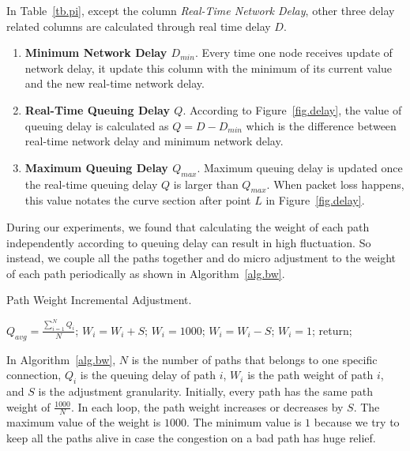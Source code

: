 In Table~\ref{tb.pi}, except the column \emph{Real-Time Network Delay}, other three delay related columns are calculated through real time delay $D$.

\begin{enumerate}
\item \textbf{Minimum Network Delay $D_{min}$}. Every time one node receives update of network delay, it update this column with the minimum of its current value and the new real-time network delay.
\item \textbf{Real-Time Queuing Delay $Q$}. According to Figure~\ref{fig.delay}, the value of queuing delay is calculated as $Q=D-D_{min}$ which is the difference between real-time network delay and minimum network delay.
\item \textbf{Maximum Queuing Delay $Q_{max}$}. Maximum queuing delay is updated once the real-time queuing delay $Q$ is larger than $Q_{max}$. When packet loss happens, this value notates the curve section after point $L$ in Figure~\ref{fig.delay}.
\end{enumerate}


During our experiments, we found that calculating the weight of each path independently according to queuing delay can result in high fluctuation. So instead, we couple all the paths together and do micro adjustment to the weight of each path periodically as shown in Algorithm~\ref{alg.bw}.

\begin{algorithm}
\caption{Path Weight Incremental Adjustment.}
\label{alg.bw}
\begin{algorithmic}[1]
\STATE  $Q_{avg}= \frac{\sum_{i=1}^{N}Q_i}{N}$;
    \STATE $W_i=W_i+S$;
	    \STATE $W_i=1000$;
	\ENDIF
\ELSE
    \STATE $W_i=W_i-S$;
	    \STATE $W_i=1$;
	\ENDIF
\ENDIF
\STATE return;
\end{algorithmic}
\end{algorithm}

In Algorithm~\ref{alg.bw}, $N$ is the number of paths that belongs to one specific connection, $Q_i$ is the queuing delay of path $i$, $W_i$ is the path weight of path $i$, and $S$ is the adjustment granularity. Initially, every path has the same path weight of $\frac{1000}{N}$. In each loop, the path weight increases or decreases by $S$. The maximum value of the weight is $1000$. The minimum value is $1$ because we try to keep all the paths alive in case the congestion on a bad path has huge relief.

